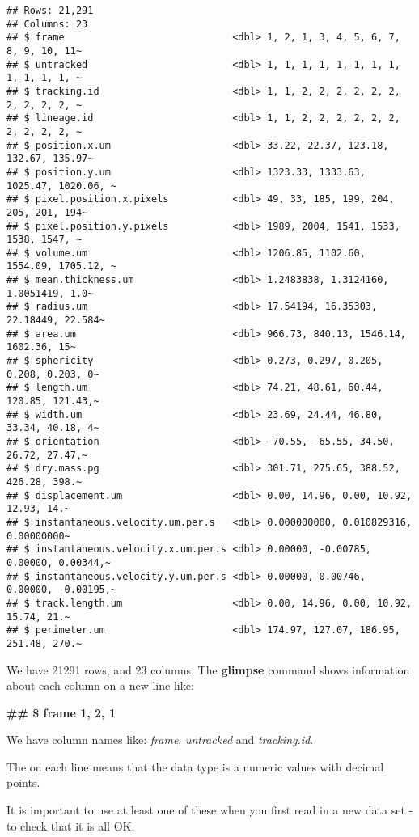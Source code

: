 \documentclass[
]{article}
\begin{document}
\begin{verbatim}
## Rows: 21,291
## Columns: 23
## $ frame                             <dbl> 1, 2, 1, 3, 4, 5, 6, 7, 8, 9, 10, 11~
## $ untracked                         <dbl> 1, 1, 1, 1, 1, 1, 1, 1, 1, 1, 1, 1, ~
## $ tracking.id                       <dbl> 1, 1, 2, 2, 2, 2, 2, 2, 2, 2, 2, 2, ~
## $ lineage.id                        <dbl> 1, 1, 2, 2, 2, 2, 2, 2, 2, 2, 2, 2, ~
## $ position.x.um                     <dbl> 33.22, 22.37, 123.18, 132.67, 135.97~
## $ position.y.um                     <dbl> 1323.33, 1333.63, 1025.47, 1020.06, ~
## $ pixel.position.x.pixels           <dbl> 49, 33, 185, 199, 204, 205, 201, 194~
## $ pixel.position.y.pixels           <dbl> 1989, 2004, 1541, 1533, 1538, 1547, ~
## $ volume.um                         <dbl> 1206.85, 1102.60, 1554.09, 1705.12, ~
## $ mean.thickness.um                 <dbl> 1.2483838, 1.3124160, 1.0051419, 1.0~
## $ radius.um                         <dbl> 17.54194, 16.35303, 22.18449, 22.584~
## $ area.um                           <dbl> 966.73, 840.13, 1546.14, 1602.36, 15~
## $ sphericity                        <dbl> 0.273, 0.297, 0.205, 0.208, 0.203, 0~
## $ length.um                         <dbl> 74.21, 48.61, 60.44, 120.85, 121.43,~
## $ width.um                          <dbl> 23.69, 24.44, 46.80, 33.34, 40.18, 4~
## $ orientation                       <dbl> -70.55, -65.55, 34.50, 26.72, 27.47,~
## $ dry.mass.pg                       <dbl> 301.71, 275.65, 388.52, 426.28, 398.~
## $ displacement.um                   <dbl> 0.00, 14.96, 0.00, 10.92, 12.93, 14.~
## $ instantaneous.velocity.um.per.s   <dbl> 0.000000000, 0.010829316, 0.00000000~
## $ instantaneous.velocity.x.um.per.s <dbl> 0.00000, -0.00785, 0.00000, 0.00344,~
## $ instantaneous.velocity.y.um.per.s <dbl> 0.00000, 0.00746, 0.00000, -0.00195,~
## $ track.length.um                   <dbl> 0.00, 14.96, 0.00, 10.92, 15.74, 21.~
## $ perimeter.um                      <dbl> 174.97, 127.07, 186.95, 251.48, 270.~
\end{verbatim}

We have 21291 rows, and 23 columns. The \textbf{glimpse} command shows
information about each column on a new line like:

\textbf{\#\# \$ frame 1, 2, 1}

We have column names like: \emph{frame}, \emph{untracked} and
\emph{tracking.id}.

The \textbf{} on each line means that the data type is a numeric values
with decimal points.

It is important to use at least one of these when you first read in a
new data set - to check that it is all OK.
\end{document}
